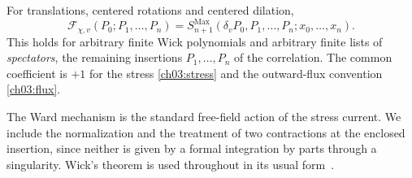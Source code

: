 \begin{proposition}\label{ch03:free-ward}
For translations, centered rotations and centered dilation,
\begin{equation}\label{ch03:ward-identity}
 \mathcal F_{\chi,v}(P_0;P_1,\ldots,P_n)
 =S_{n+1}^{\mathrm{Max}}(\delta_vP_0,P_1,\ldots,P_n;x_0,\ldots,x_n).
\end{equation}
This holds for arbitrary finite Wick polynomials and arbitrary finite
lists of \emph{spectators}, the remaining insertions $P_1,\ldots,P_n$ of the correlation. The common coefficient is $+1$ for the stress
\eqref{ch03:stress} and the outward-flux convention \eqref{ch03:flux}.
\end{proposition}

The Ward mechanism is the standard free-field action of the stress
current. We include the normalization and the treatment of two
contractions at the enclosed insertion, since neither is given by a
formal integration by parts through a singularity. Wick's theorem is
used throughout in its usual form~\cite{Wick1950}.


